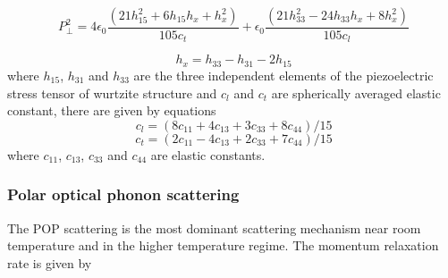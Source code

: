 \documentclass[12pt]{article}
\begin{document}
\begin{equation}
\ P_{\perp}^2 = 4 \epsilon_0 \frac{(21 h_{15}^2 + 6 h_{15} h_{x } + h_x^2)}{105c_t} + \epsilon_0 \frac{(21 h_{33}^2 - 24 h_{33} h_x + 8 h_x^2)}{105c_l}  
\label{pzcoeff_perp}
\end{equation}

\begin{equation}
\ h_x = h_{33} - h_{31} - 2h_{15}
\label{hx}
\end{equation}
where $h_{15}$, $h_{31}$ and $h_{33}$ are the three independent elements of the piezoelectric stress tensor of wurtzite structure and $c_l$ and $c_t$ are spherically averaged elastic constant, there are given by equations \cite{rode1,rode3}
\begin{equation}
\ c_l = (8c_{11} + 4c_{13} + 3c_{33} + 8c_{44})/15 
\label{cl_w}
\end{equation}
\begin{equation}
\ c_t = (2c_{11} - 4c_{13} + 2c_{33} + 7c_{44})/15 
\label{ct_w}
\end{equation}
where  $c_{11}$, $c_{13}$, $c_{33}$ and $c_{44}$ are elastic constants.

\subsubsection{Polar optical phonon scattering}
The POP scattering is the most dominant scattering mechanism near room temperature and in the higher temperature regime. The momentum relaxation rate is given by \cite{ref5,rode1}
\end{document}
